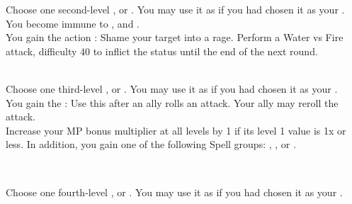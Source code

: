 \begin{tabjob}
         Choose one second-level ,  or . You may use it as if you had chosen it as your . \\

         You become immune to ,  and . \\

         You gain the  action : Shame your target into a rage. Perform a Water vs Fire attack, difficulty 40 to inflict the  status until the end of the next round. \\
    
    \tabjobsep%
    
     \\
    \tabjobspec{}
         Choose one third-level ,  or . You may use it as if you had chosen it as your . \\
        
         You gain the  : Use this  after an ally rolls an attack. Your ally may reroll the attack. \\

         Increase your MP bonus multiplier at all levels by 1 if its level 1 value is 1x or less. In addition, you gain one of the following Spell groups: , ,  or . \\

    \tabjobsep%

     \\
    \tabjobspec{}

         Choose one fourth-level ,  or . You may use it as if you had chosen it as your . \\


\end{tabjob}
